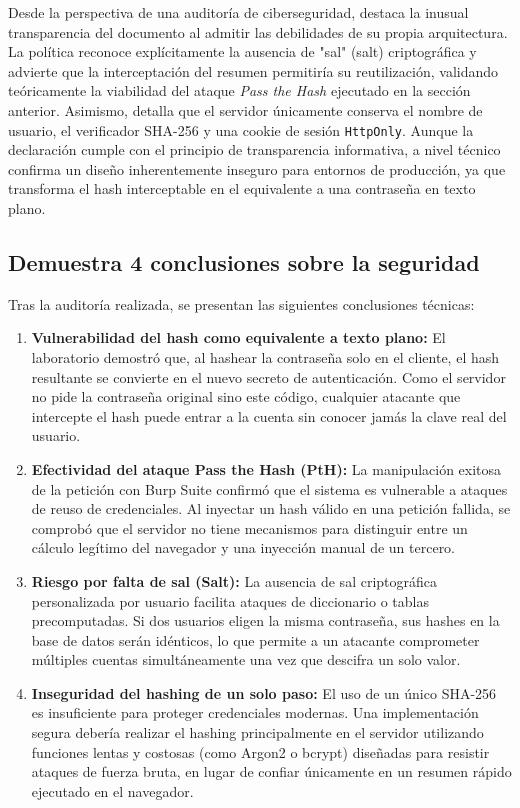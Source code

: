 \documentclass[letter,12pt]{article}
\begin{document}
Desde la perspectiva de una auditoría de ciberseguridad, destaca la inusual transparencia del documento al admitir las debilidades de su propia arquitectura. La política reconoce explícitamente la ausencia de "sal" (salt) criptográfica y advierte que la interceptación del resumen permitiría su reutilización, validando teóricamente la viabilidad del ataque \textit{Pass the Hash} ejecutado en la sección anterior. Asimismo, detalla que el servidor únicamente conserva el nombre de usuario, el verificador SHA-256 y una cookie de sesión \texttt{HttpOnly}. Aunque la declaración cumple con el principio de transparencia informativa, a nivel técnico confirma un diseño inherentemente inseguro para entornos de producción, ya que transforma el hash interceptable en el equivalente a una contraseña en texto plano.

\subsection{Demuestra 4 conclusiones sobre la seguridad}

Tras la auditoría realizada, se presentan las siguientes conclusiones técnicas:

\begin{enumerate}
    \item \textbf{Vulnerabilidad del hash como equivalente a texto plano:} El laboratorio demostró que, al hashear la contraseña solo en el cliente, el hash resultante se convierte en el nuevo secreto de autenticación. Como el servidor no pide la contraseña original sino este código, cualquier atacante que intercepte el hash puede entrar a la cuenta sin conocer jamás la clave real del usuario.
    
    \item \textbf{Efectividad del ataque Pass the Hash (PtH):} La manipulación exitosa de la petición con Burp Suite confirmó que el sistema es vulnerable a ataques de reuso de credenciales. Al inyectar un hash válido en una petición fallida, se comprobó que el servidor no tiene mecanismos para distinguir entre un cálculo legítimo del navegador y una inyección manual de un tercero.
    
    \item \textbf{Riesgo por falta de sal (Salt):} La ausencia de sal criptográfica personalizada por usuario facilita ataques de diccionario o tablas precomputadas. Si dos usuarios eligen la misma contraseña, sus hashes en la base de datos serán idénticos, lo que permite a un atacante comprometer múltiples cuentas simultáneamente una vez que descifra un solo valor.
    
    \item \textbf{Inseguridad del hashing de un solo paso:} El uso de un único SHA-256 es insuficiente para proteger credenciales modernas. Una implementación segura debería realizar el hashing principalmente en el servidor utilizando funciones lentas y costosas (como Argon2 o bcrypt) diseñadas para resistir ataques de fuerza bruta, en lugar de confiar únicamente en un resumen rápido ejecutado en el navegador.
\end{enumerate}
\end{document}
